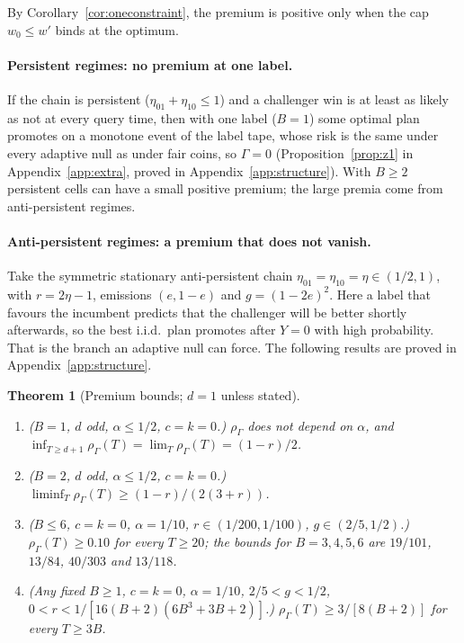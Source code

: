\documentclass{article}
\theoremstyle{plain}
\newtheorem{theorem}{Theorem}
\theoremstyle{definition}
\theoremstyle{remark}
\newcommand{\rhoG}{\rho_\Gamma}
\begin{document}
By Corollary~\ref{cor:oneconstraint}, the premium is positive only when the cap $w_0\le w'$ binds at the optimum.

\paragraph{Persistent regimes: no premium at one label.} If the chain is persistent ($\eta_{01}+\eta_{10}\le 1$) and a challenger win is at least as likely as not at every query time, then with one label ($B=1$) some optimal plan promotes on a monotone event of the label tape, whose risk is the same under every adaptive null as under fair coins, so $\Gamma=0$ (Proposition~\ref{prop:z1} in Appendix~\ref{app:extra}, proved in Appendix~\ref{app:structure}). With $B\ge 2$ persistent cells can have a small positive premium; the large premia come from anti-persistent regimes.

\paragraph{Anti-persistent regimes: a premium that does not vanish.} Take the symmetric stationary anti-persistent chain $\eta_{01}=\eta_{10}=\eta\in(1/2,1)$, with $r=2\eta-1$, emissions $(e,1-e)$ and $g=(1-2e)^2$. Here a label that favours the incumbent predicts that the challenger will be better shortly afterwards, so the best i.i.d.\ plan promotes after $Y=0$ with high probability. That is the branch an adaptive null can force. The following results are proved in Appendix~\ref{app:structure}.

\begin{theorem}[Premium bounds; $d=1$ unless stated]
\label{thm:premium}
\begin{enumerate}
\item ($B=1$, $d$ odd, $\alpha\le1/2$, $c=k=0$.) $\rhoG$ does not depend on $\alpha$, and $\inf_{T\ge d+1}\rhoG(T)=\lim_T\rhoG(T)=(1-r)/2$.
\item ($B=2$, $d$ odd, $\alpha\le 1/2$, $c=k=0$.) $\liminf_T\rhoG(T)\ge(1-r)/(2(3+r))$.
\item ($B\le 6$, $c=k=0$, $\alpha=1/10$, $r\in(1/200,1/100)$, $g\in(2/5,1/2)$.) $\rhoG(T)\ge 0.10$ for every $T\ge 20$; the bounds for $B=3,4,5,6$ are $19/101$, $13/84$, $40/303$ and $13/118$.
\item (Any fixed $B\ge 1$, $c=k=0$, $\alpha=1/10$, $2/5<g<1/2$, $0<r<1/[16(B+2)(6B^3+3B+2)]$.) $\rhoG(T)\ge 3/[8(B+2)]$ for every $T\ge 3B$.
\end{enumerate}
\end{theorem}
\end{document}
